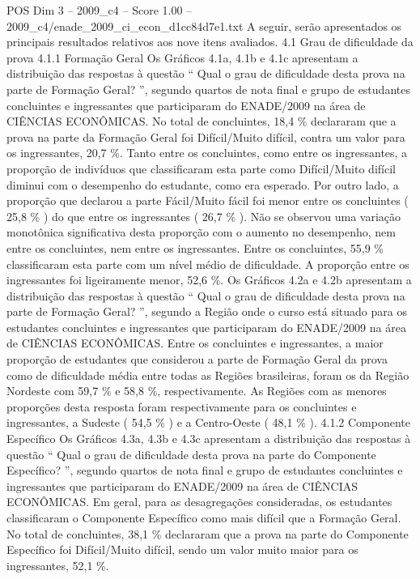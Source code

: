 \begin{textsample}{POS Dim 3 – 2009\_c4 – Score 1.00 – 2009\_c4/enade\_2009\_ci\_econ\_d1cc84d7e1.txt}
A seguir, serão apresentados os principais resultados relativos aos nove itens avaliados. 4.1 Grau de dificuldade da prova 4.1.1 Formação Geral Os Gráficos 4.1a, 4.1b e 4.1c apresentam a distribuição das respostas à questão “ Qual o grau de dificuldade desta prova na parte de Formação Geral? ”, segundo quartos de nota final e grupo de estudantes concluintes e ingressantes que participaram do ENADE/2009 na área de CIÊNCIAS ECONÔMICAS.
No total de concluintes, 18,4 \% declararam que a prova na parte da Formação Geral foi Difícil/Muito difícil, contra um valor para os ingressantes, 20,7 \%.
Tanto entre os concluintes, como entre os ingressantes, a proporção de indivíduos que classificaram esta parte como Difícil/Muito difícil diminui com o desempenho do estudante, como era esperado.
Por outro lado, a proporção que declarou a parte Fácil/Muito fácil foi menor entre os concluintes ( 25,8 \% ) do que entre os ingressantes ( 26,7 \% ).
Não se observou uma variação monotônica significativa desta proporção com o aumento no desempenho, nem entre os concluintes, nem entre os ingressantes.
Entre os concluintes, 55,9 \% classificaram esta parte com um nível médio de dificuldade.
A proporção entre os ingressantes foi ligeiramente menor, 52,6 \%.
Os Gráficos 4.2a e 4.2b apresentam a distribuição das respostas à questão “ Qual o grau de dificuldade desta prova na parte de Formação Geral? ”, segundo a Região onde o curso está situado para os estudantes concluintes e ingressantes que participaram do ENADE/2009 na área de CIÊNCIAS ECONÔMICAS.
Entre os concluintes e ingressantes, a maior proporção de estudantes que considerou a parte de Formação Geral da prova como de dificuldade média entre todas as Regiões brasileiras, foram os da Região Nordeste com 59,7 \% e 58,8 \%, respectivamente.
As Regiões com as menores proporções desta resposta foram respectivamente para os concluintes e ingressantes, a Sudeste ( 54,5 \% ) e a Centro-Oeste ( 48,1 \% ). 4.1.2 Componente Específico Os Gráficos 4.3a, 4.3b e 4.3c apresentam a distribuição das respostas à questão “ Qual o grau de dificuldade desta prova na parte do Componente Específico? ”, segundo quartos de nota final e grupo de estudantes concluintes e ingressantes que participaram do ENADE/2009 na área de CIÊNCIAS ECONÔMICAS.
Em geral, para as desagregações consideradas, os estudantes classificaram o Componente Específico como mais difícil que a Formação Geral.
No total de concluintes, 38,1 \% declararam que a prova na parte do Componente Específico foi Difícil/Muito difícil, sendo um valor muito maior para os ingressantes, 52,1 \%.

\end{textsample}
